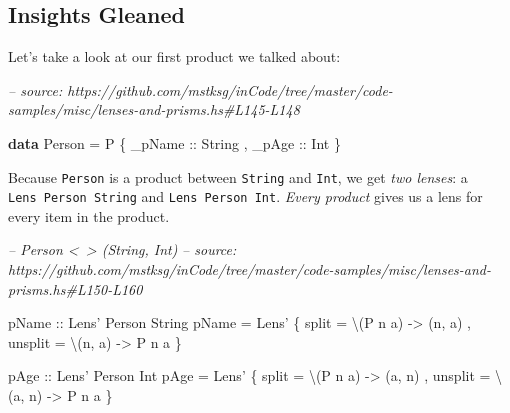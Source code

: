 \documentclass[]{article}
\newenvironment{Shaded}{}{}
\newcommand{\CommentTok}[1]{\textcolor[rgb]{0.38,0.63,0.69}{\textit{#1}}}
\newcommand{\DataTypeTok}[1]{\textcolor[rgb]{0.56,0.13,0.00}{#1}}
\newcommand{\FunctionTok}[1]{\textcolor[rgb]{0.02,0.16,0.49}{#1}}
\newcommand{\KeywordTok}[1]{\textcolor[rgb]{0.00,0.44,0.13}{\textbf{#1}}}
\newcommand{\NormalTok}[1]{#1}
\newcommand{\OtherTok}[1]{\textcolor[rgb]{0.00,0.44,0.13}{#1}}
\begin{document}
\hypertarget{insights-gleaned}{%
\subsection{Insights Gleaned}\label{insights-gleaned}}

Let's take a look at our first product we talked about:

\begin{Shaded}
\begin{Highlighting}[]
\CommentTok{-- source: https://github.com/mstksg/inCode/tree/master/code-samples/misc/lenses-and-prisms.hs#L145-L148}

\KeywordTok{data} \DataTypeTok{Person} \FunctionTok{=} \DataTypeTok{P}
\NormalTok{    \{}\OtherTok{ _pName ::} \DataTypeTok{String}
\NormalTok{    ,}\OtherTok{ _pAge  ::} \DataTypeTok{Int}
\NormalTok{    \}}
\end{Highlighting}
\end{Shaded}

Because \texttt{Person} is a product between \texttt{String} and \texttt{Int},
we get \emph{two lenses}: a \texttt{Lens\textquotesingle{}\ Person\ String} and
\texttt{Lens\textquotesingle{}\ Person\ Int}. \emph{Every product} gives us a
lens for every item in the product.

\begin{Shaded}
\begin{Highlighting}[]
\CommentTok{-- Person <~> (String, Int)}
\CommentTok{-- source: https://github.com/mstksg/inCode/tree/master/code-samples/misc/lenses-and-prisms.hs#L150-L160}

\OtherTok{pName ::} \DataTypeTok{Lens'} \DataTypeTok{Person} \DataTypeTok{String}
\NormalTok{pName }\FunctionTok{=} \DataTypeTok{Lens'}
\NormalTok{    \{ split   }\FunctionTok{=}\NormalTok{ \textbackslash{}(}\DataTypeTok{P}\NormalTok{ n a) }\OtherTok{->}\NormalTok{ (n, a)}
\NormalTok{    , unsplit }\FunctionTok{=}\NormalTok{ \textbackslash{}(n, a)  }\OtherTok{->} \DataTypeTok{P}\NormalTok{ n a}
\NormalTok{    \}}

\OtherTok{pAge ::} \DataTypeTok{Lens'} \DataTypeTok{Person} \DataTypeTok{Int}
\NormalTok{pAge }\FunctionTok{=} \DataTypeTok{Lens'}
\NormalTok{    \{ split   }\FunctionTok{=}\NormalTok{ \textbackslash{}(}\DataTypeTok{P}\NormalTok{ n a) }\OtherTok{->}\NormalTok{ (a, n)}
\NormalTok{    , unsplit }\FunctionTok{=}\NormalTok{ \textbackslash{}(a, n)  }\OtherTok{->} \DataTypeTok{P}\NormalTok{ n a}
\NormalTok{    \}}
\end{Highlighting}
\end{Shaded}
\end{document}
